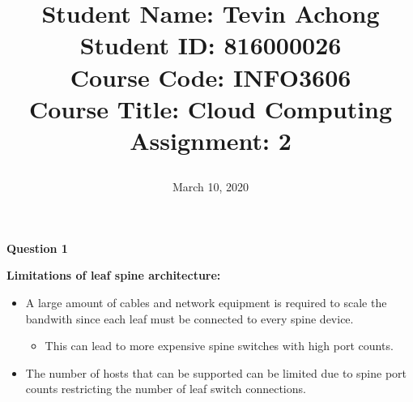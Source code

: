 \documentclass[a4paper, 12pt]{article}
\begin{document}
\title{
		\textbf{Student Name:} Tevin Achong\\
		\textbf{Student ID:} 816000026\\
		\textbf{Course Code:} INFO3606\\
		\textbf{Course Title:} Cloud Computing\\
		\textbf{Assignment:} 2
		\date{March 10, 2020}
}
\maketitle

\newpage
{}

\begin{center}
	\textbf{Question 1}
\end{center}

\textbf{Limitations of leaf spine architecture:}
\begin{itemize}
\item
A large amount of cables and network equipment is required to scale the bandwith since each leaf must be connected to every spine device.
\begin{itemize}
\item
This can lead to more expensive spine switches with high port counts.
\end{itemize}
\item
The number of hosts that can be supported can be limited due to spine port counts restricting the number of leaf switch connections.
\end{itemize}
\end{document}
